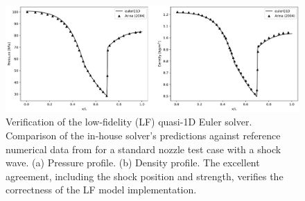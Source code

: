 \documentclass[tg, EN]{ufabcFHZh_tg}
\begin{document}
\begin{figure}[H]
    \centering
    \includegraphics[width=\textwidth]{Figuras/arina_validation.png}
    \caption{Verification of the low-fidelity (LF) quasi-1D Euler solver. Comparison of the in-house solver's predictions against reference numerical data from \citep{arina2004} for a standard nozzle test case with a shock wave. (a) Pressure profile. (b) Density profile. The excellent agreement, including the shock position and strength, verifies the correctness of the LF model implementation.}
    \label{fig:lf_verification}
\end{figure}






\end{document}
